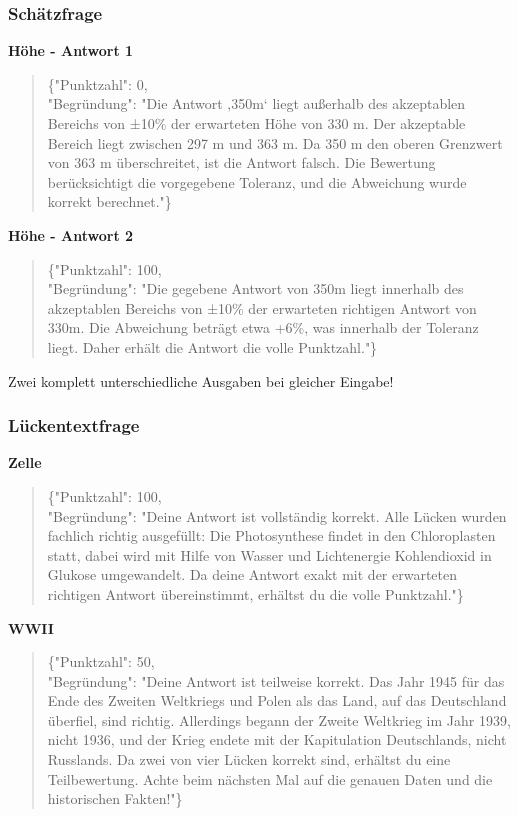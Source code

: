 \documentclass[a4paper,12pt]{article}
\begin{document}
\subsubsection{Schätzfrage}

\textbf{Höhe - Antwort 1}
\begin{quote}
\{"Punktzahl": 0,\\
"Begründung": "Die Antwort ‚350m‘ liegt außerhalb des akzeptablen Bereichs von ±10\% der erwarteten Höhe von 330 m. Der akzeptable Bereich liegt zwischen 297 m und 363 m. Da 350 m den oberen Grenzwert von 363 m überschreitet, ist die Antwort falsch. Die Bewertung berücksichtigt die vorgegebene Toleranz, und die Abweichung wurde korrekt berechnet."\}
\end{quote}

\textbf{Höhe - Antwort 2}
\begin{quote}
\{"Punktzahl": 100,\\
"Begründung": "Die gegebene Antwort von 350m liegt innerhalb des akzeptablen Bereichs von ±10\% der erwarteten richtigen Antwort von 330m. Die Abweichung beträgt etwa +6\%, was innerhalb der Toleranz liegt. Daher erhält die Antwort die volle Punktzahl."\}
\end{quote}

Zwei komplett unterschiedliche Ausgaben bei gleicher Eingabe!

\subsubsection{Lückentextfrage}

\textbf{Zelle}
\begin{quote}
\{"Punktzahl": 100,\\
"Begründung": "Deine Antwort ist vollständig korrekt. Alle Lücken wurden fachlich richtig ausgefüllt: Die Photosynthese findet in den Chloroplasten statt, dabei wird mit Hilfe von Wasser und Lichtenergie Kohlendioxid in Glukose umgewandelt. Da deine Antwort exakt mit der erwarteten richtigen Antwort übereinstimmt, erhältst du die volle Punktzahl."\}
\end{quote}

\textbf{WWII}
\begin{quote}
\{"Punktzahl": 50,\\
"Begründung": "Deine Antwort ist teilweise korrekt. Das Jahr 1945 für das Ende des Zweiten Weltkriegs und Polen als das Land, auf das Deutschland überfiel, sind richtig. Allerdings begann der Zweite Weltkrieg im Jahr 1939, nicht 1936, und der Krieg endete mit der Kapitulation Deutschlands, nicht Russlands. Da zwei von vier Lücken korrekt sind, erhältst du eine Teilbewertung. Achte beim nächsten Mal auf die genauen Daten und die historischen Fakten!"\}
\end{quote}
\end{document}
